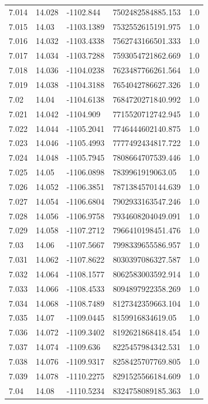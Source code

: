 \begin{tabular}{lllll}
7.014 & 14.028 & -1102.844 & 7502482584885.153 & 1.0 \\
7.015 & 14.03 & -1103.1389 & 7532552615191.975 & 1.0 \\
7.016 & 14.032 & -1103.4338 & 7562743166501.333 & 1.0 \\
7.017 & 14.034 & -1103.7288 & 7593054721862.669 & 1.0 \\
7.018 & 14.036 & -1104.0238 & 7623487766261.564 & 1.0 \\
7.019 & 14.038 & -1104.3188 & 7654042786627.326 & 1.0 \\
7.02 & 14.04 & -1104.6138 & 7684720271840.992 & 1.0 \\
7.021 & 14.042 & -1104.909 & 7715520712742.945 & 1.0 \\
7.022 & 14.044 & -1105.2041 & 7746444602140.875 & 1.0 \\
7.023 & 14.046 & -1105.4993 & 7777492434817.722 & 1.0 \\
7.024 & 14.048 & -1105.7945 & 7808664707539.446 & 1.0 \\
7.025 & 14.05 & -1106.0898 & 7839961919063.05 & 1.0 \\
7.026 & 14.052 & -1106.3851 & 7871384570144.639 & 1.0 \\
7.027 & 14.054 & -1106.6804 & 7902933163547.246 & 1.0 \\
7.028 & 14.056 & -1106.9758 & 7934608204049.091 & 1.0 \\
7.029 & 14.058 & -1107.2712 & 7966410198451.476 & 1.0 \\
7.03 & 14.06 & -1107.5667 & 7998339655586.957 & 1.0 \\
7.031 & 14.062 & -1107.8622 & 8030397086327.587 & 1.0 \\
7.032 & 14.064 & -1108.1577 & 8062583003592.914 & 1.0 \\
7.033 & 14.066 & -1108.4533 & 8094897922358.269 & 1.0 \\
7.034 & 14.068 & -1108.7489 & 8127342359663.104 & 1.0 \\
7.035 & 14.07 & -1109.0445 & 8159916834619.05 & 1.0 \\
7.036 & 14.072 & -1109.3402 & 8192621868418.454 & 1.0 \\
7.037 & 14.074 & -1109.636 & 8225457984342.531 & 1.0 \\
7.038 & 14.076 & -1109.9317 & 8258425707769.805 & 1.0 \\
7.039 & 14.078 & -1110.2275 & 8291525566184.609 & 1.0 \\
7.04 & 14.08 & -1110.5234 & 8324758089185.363 & 1.0 \\

\end{tabular}
